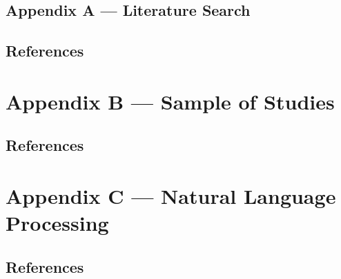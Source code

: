 \documentclass[nobib]{tufte-handout}
\begin{document}
\begin{refsection}

\section{Appendix A --- Literature Search}
\label{sec:sampling}

\setcounter{table}{0}
\renewcommand{\thetable}{A\arabic{table}}
\renewcommand{\thefigure}{A\arabic{figure}}



\subsection{References}

\printbibliography[heading=none]

\end{refsection}

\section{Appendix B --- Sample of Studies}
\label{sec:sample_of_studies}

\begin{refsection}

  \setcounter{table}{0}
\renewcommand{\thetable}{B\arabic{table}}
\renewcommand{\thefigure}{B\arabic{figure}}



\subsection{References}

\printbibliography[heading=none]

\end{refsection}

\section{Appendix C --- Natural Language Processing}
\label{sec:nlp}

\begin{refsection}

\setcounter{table}{0}
\renewcommand{\thetable}{c\arabic{table}}
\renewcommand{\thefigure}{C\arabic{figure}}



\subsection{References}

\printbibliography[heading=none]

\end{refsection}


\end{document}
